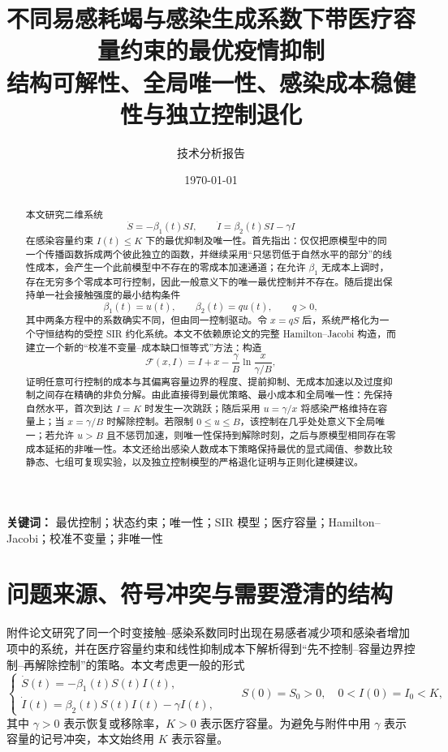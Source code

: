 \documentclass[11pt,a4paper,UTF8]{ctexart}
\title{\bfseries 不同易感耗竭与感染生成系数下带医疗容量约束的最优疫情抑制\\
\large 结构可解性、全局唯一性、感染成本稳健性与独立控制退化}
\author{技术分析报告}
\date{\today}
\theoremstyle{definition}
\newcommand{\Fcal}{\mathcal{F}}
\begin{document}
\maketitle

\begin{abstract}
本文研究二维系统
\[
\dot S=-\beta_1(t)SI,\qquad
\dot I=\beta_2(t)SI-\gamma I
\]
在感染容量约束 $I(t)\le K$ 下的最优抑制及唯一性。首先指出：仅仅把原模型中的同一个传播函数拆成两个彼此独立的函数，并继续采用“只惩罚低于自然水平的部分”的线性成本，会产生一个此前模型中不存在的零成本加速通道；在允许 $\beta_1$ 无成本上调时，存在无穷多个零成本可行控制，因此一般意义下的唯一最优控制并不存在。随后提出保持单一社会接触强度的最小结构条件
\[
\beta_1(t)=u(t),\qquad \beta_2(t)=q u(t),\qquad q>0,
\]
其中两条方程中的系数确实不同，但由同一控制驱动。令 $x=qS$ 后，系统严格化为一个守恒结构的受控 SIR 约化系统。本文不依赖原论文的完整 Hamilton--Jacobi 构造，而建立一个新的“校准不变量--成本缺口恒等式”方法：构造
\[
\Fcal(x,I)=I+x-\frac{\gamma}{B}\ln\frac{x}{\gamma/B},
\]
证明任意可行控制的成本与其偏离容量边界的程度、提前抑制、无成本加速以及过度抑制之间存在精确的非负分解。由此直接得到最优策略、最小成本和全局唯一性：先保持自然水平，首次到达 $I=K$ 时发生一次跳跃；随后采用 $u=\gamma/x$ 将感染严格维持在容量上；当 $x=\gamma/B$ 时解除控制。若限制 $0\le u\le B$，该控制在几乎处处意义下全局唯一；若允许 $u>B$ 且不惩罚加速，则唯一性保持到解除时刻，之后与原模型相同存在零成本延拓的非唯一性。本文还给出感染人数成本下策略保持最优的显式阈值、参数比较静态、七组可复现实验，以及独立控制模型的严格退化证明与正则化建模建议。
\end{abstract}

\noindent\textbf{关键词：} 最优控制；状态约束；唯一性；SIR 模型；医疗容量；Hamilton--Jacobi；校准不变量；非唯一性

\tableofcontents
\newpage

\section{问题来源、符号冲突与需要澄清的结构}

附件论文研究了同一个时变接触--感染系数同时出现在易感者减少项和感染者增加项中的系统，并在医疗容量约束和线性抑制成本下解析得到“先不控制--容量边界控制--再解除控制”的策略\citep{MicloSpiroWeibull2022}。本文考虑更一般的形式
\begin{equation}
\begin{cases}
\dot S(t)=-\beta_1(t)S(t)I(t),\\
\dot I(t)=\beta_2(t)S(t)I(t)-\gamma I(t),
\end{cases}
\qquad S(0)=S_0>0,\quad 0<I(0)=I_0<K,
\label{eq:general-model}
\end{equation}
其中 $\gamma>0$ 表示恢复或移除率，$K>0$ 表示医疗容量。为避免与附件中用 $\gamma$ 表示容量的记号冲突，本文始终用 $K$ 表示容量。
\end{document}
